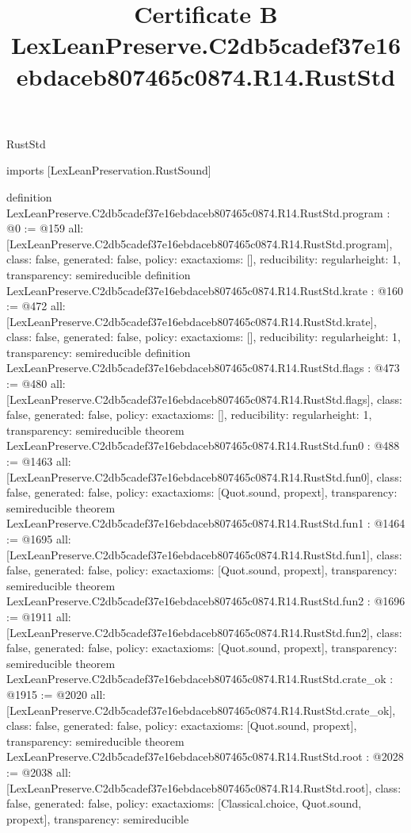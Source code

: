 \begin{lexlean}{RustStd}
\title{Certificate B LexLeanPreserve.C2db5cadef37e16ebdaceb807465c0874.R14.RustStd}
\begin{coremodule}
imports [LexLeanPreservation.RustSound]

definition LexLeanPreserve.C2db5cadef37e16ebdaceb807465c0874.R14.RustStd.program : @0 := @159 {
  all: [LexLeanPreserve.C2db5cadef37e16ebdaceb807465c0874.R14.RustStd.program],
  class: false,
  generated: false,
  policy: exact{axioms: []},
  reducibility: regular{height: 1},
  transparency: semireducible
}
definition LexLeanPreserve.C2db5cadef37e16ebdaceb807465c0874.R14.RustStd.krate : @160 := @472 {
  all: [LexLeanPreserve.C2db5cadef37e16ebdaceb807465c0874.R14.RustStd.krate],
  class: false,
  generated: false,
  policy: exact{axioms: []},
  reducibility: regular{height: 1},
  transparency: semireducible
}
definition LexLeanPreserve.C2db5cadef37e16ebdaceb807465c0874.R14.RustStd.flags : @473 := @480 {
  all: [LexLeanPreserve.C2db5cadef37e16ebdaceb807465c0874.R14.RustStd.flags],
  class: false,
  generated: false,
  policy: exact{axioms: []},
  reducibility: regular{height: 1},
  transparency: semireducible
}
theorem LexLeanPreserve.C2db5cadef37e16ebdaceb807465c0874.R14.RustStd.fun0 : @488 := @1463 {
  all: [LexLeanPreserve.C2db5cadef37e16ebdaceb807465c0874.R14.RustStd.fun0],
  class: false,
  generated: false,
  policy: exact{axioms: [Quot.sound, propext]},
  transparency: semireducible
}
theorem LexLeanPreserve.C2db5cadef37e16ebdaceb807465c0874.R14.RustStd.fun1 : @1464 := @1695 {
  all: [LexLeanPreserve.C2db5cadef37e16ebdaceb807465c0874.R14.RustStd.fun1],
  class: false,
  generated: false,
  policy: exact{axioms: [Quot.sound, propext]},
  transparency: semireducible
}
theorem LexLeanPreserve.C2db5cadef37e16ebdaceb807465c0874.R14.RustStd.fun2 : @1696 := @1911 {
  all: [LexLeanPreserve.C2db5cadef37e16ebdaceb807465c0874.R14.RustStd.fun2],
  class: false,
  generated: false,
  policy: exact{axioms: [Quot.sound, propext]},
  transparency: semireducible
}
theorem LexLeanPreserve.C2db5cadef37e16ebdaceb807465c0874.R14.RustStd.crate_ok : @1915 := @2020 {
  all: [LexLeanPreserve.C2db5cadef37e16ebdaceb807465c0874.R14.RustStd.crate_ok],
  class: false,
  generated: false,
  policy: exact{axioms: [Quot.sound, propext]},
  transparency: semireducible
}
theorem LexLeanPreserve.C2db5cadef37e16ebdaceb807465c0874.R14.RustStd.root : @2028 := @2038 {
  all: [LexLeanPreserve.C2db5cadef37e16ebdaceb807465c0874.R14.RustStd.root],
  class: false,
  generated: false,
  policy: exact{axioms: [Classical.choice, Quot.sound, propext]},
  transparency: semireducible
}


\end{coremodule}
\end{lexlean}
